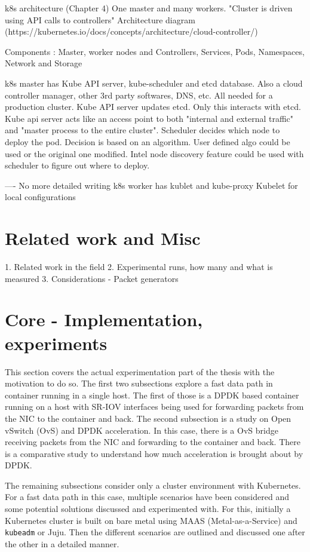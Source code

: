 \documentclass[english, 12pt, a4paper, elec, utf8, a-1b, online]{aaltothesis}
\begin{document}
k8s architecture (Chapter 4)
One master and many workers. "Cluster is driven using API calls to controllers" Architecture diagram (https://kubernetes.io/docs/concepts/architecture/cloud-controller/)

Components : Master, worker nodes and Controllers, Services, Pods, Namespaces, Network and Storage

k8s master has Kube API server, kube-scheduler and etcd database.
Also a cloud controller manager, other 3rd party softwares, DNS, etc. All needed for a production cluster. Kube API server updates etcd. Only this interacts with etcd.
Kube api server acts like an access point to both "internal and external traffic" and "master process to the entire cluster".
Scheduler decides which node to deploy the pod. Decision is  based on an algorithm. User defined algo could be used or the original one modified. Intel node discovery feature could be used with scheduler to figure out where to deploy.

---- No more detailed writing
k8s worker has kublet and kube-proxy
Kubelet for local configurations

\clearpage
\section{Related work and Misc}
1. Related work in the field
2. Experimental runs, how many and what is measured
3. Considerations - Packet generators


\clearpage
\section{Core - Implementation, experiments}
This section covers the actual experimentation part of the thesis with the motivation to do so. The first two subsections explore a fast data path in container running in a single host. The first of those is a DPDK based container running on a host with SR-IOV interfaces being used for forwarding packets from the NIC to the container and back. The second subsection is a study on Open vSwitch (OvS) and DPDK acceleration. In this case, there is a OvS bridge receiving packets from the NIC and forwarding to the container and back. There is a comparative study to understand how much acceleration is brought about by DPDK.

The remaining subsections consider only a cluster environment with Kubernetes. For a fast data path in this case, multiple scenarios have been considered and some potential solutions discussed and experimented with. For this, initially a Kubernetes cluster is built on bare metal using MAAS (Metal-as-a-Service) and \lstinline{kubeadm} or Juju. Then the different scenarios are outlined and discussed one after the other in a detailed manner.
\end{document}

